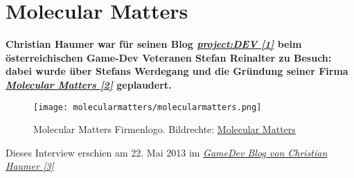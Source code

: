 \section*{Molecular Matters}
\hypertarget{molecularmatters}{}
\label{molecularmatters}

\textbf{Christian Haumer  war für seinen Blog \href{http://projectdev.humepage.at/}{\textit{project:DEV [1]}} beim österreichischen Game-Dev Veteranen Stefan Reinalter zu Besuch: dabei wurde über Stefans Werdegang und die Gründung seiner Firma \href{http://www.molecular-matters.com/company/company.html}{\textit{Molecular Matters [2]}} geplaudert.} 
\begin{figure}
\texttt{[image: molecularmatters/molecularmatters.png]} 
\caption{Molecular Matters Firmenlogo. Bildrechte: \href{http://www.molecular-matters.com}{Molecular Matters}}
\end{figure}

Dieses Interview erschien am 22. Mai 2013 im \href{http://projectdev.humepage.at/1419}{\textit{GameDev Blog von Christian Haumer [3]}}

